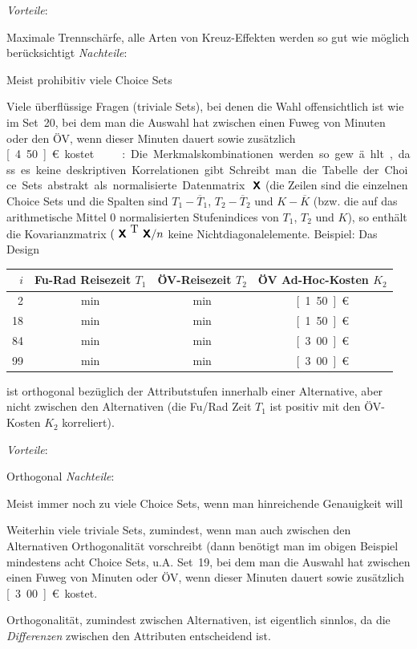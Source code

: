 \noindent
\textit{Vorteile}:
\bi
\item Maximale Trennsch\"arfe, alle Arten von Kreuz-Effekten werden so
  gut wie m\"oglich ber\"ucksich\-tigt
\ei
\textit{Nachteile}:
\bi
\item Meist prohibitiv viele Choice Sets
\item Viele \"uberfl\"ussige Fragen (triviale Sets), bei denen die
  Wahl offensichtlich ist wie im Set~20, bei dem man die Auswahl hat
  zwischen   einen Fu\3weg von 
  \unit[10]{Minuten} oder den \"OV, wenn dieser
  \unit[30]{Minuten} dauert sowie zus\"atzlich \unit[4.50]{\euro{}} kostet.
\ei

\vspace{1em}

\noindent
{}: Die Merkmalskombinationen werden so
gew\"ahlt, dass es keine deskriptiven Korrelationen gibt. Schreibt man
die Tabelle der Choice Sets abstrakt als normalisierte Datenmatrix ${\mbox{ \sf\textbf{X}}}$ (die
Zeilen sind die einzelnen Choice Sets und die Spalten sind $T_1-\overline{T}_1$,
$T_2-\overline{T}_2$ und $K-\overline{K}$ (bzw. die  auf das
arithmetische Mittel 0 normalisierten 
Stufenindices von $T_1$, $T_2$ und $K$), so
enth\"alt die Kovarianzmatrix
 $({\mbox{ \sf\textbf{X}}}^{{\mbox{ T}}}{\mbox{ \sf\textbf{X}}}/n$ keine
Nichtdiagonalelemente. Beispiel: Das Design
\begin{center}
\begin{tabular}{|r|c|c|c|} \hline
$i$ & Fu\3-Rad Reisezeit $T_1$ & \"OV-Reisezeit  $T_2$ & \"OV Ad-Hoc-Kosten $K_2$
   \\ \hline
2 & \unit[10]{min} & \unit[10]{min} & \unit[1.50]{\euro{}}\\
18 & \unit[10]{min} & \unit[30]{min} & \unit[1.50]{\euro{}}\\
84 & \unit[30]{min} & \unit[10]{min} &\unit[3.00]{\euro{}}\\
99 & \unit[30]{min} & \unit[30]{min} &\unit[3.00]{\euro{}}\\
\hline
\end{tabular}
\end{center}
ist orthogonal bez\"uglich der Attributstufen innerhalb einer
Alternative, aber nicht zwischen den Alternativen (die Fu\3/Rad Zeit
$T_1$ ist positiv mit den \"OV-Kosten $K_2$ korreliert). 
\vspace{1ex}

\noindent
\textit{Vorteile}:
\bi
\item Orthogonal
\ei
\textit{Nachteile}:
\bi
\item Meist immer noch zu viele Choice Sets, wenn man hinreichende
  Genauigkeit will
\item Weiterhin viele triviale Sets, zumindest, wenn man auch zwischen
  den Alternativen Orthogonalit\"at vorschreibt (dann ben\"otigt man
  im obigen Beispiel mindestens acht Choice Sets, u.A. Set~19, bei dem man die Auswahl hat
  zwischen 
  einen Fu\3weg von 
  \unit[10]{Minuten} oder \"OV, wenn dieser
  \unit[30]{Minuten} dauert sowie zus\"atzlich \unit[3.00]{\euro{}} kostet.
\item Orthogonalit\"at, zumindest zwischen Alternativen, ist
  eigentlich sinnlos, da die \emph{ Differenzen}
  zwischen den Attributen entscheidend ist.
\ei



